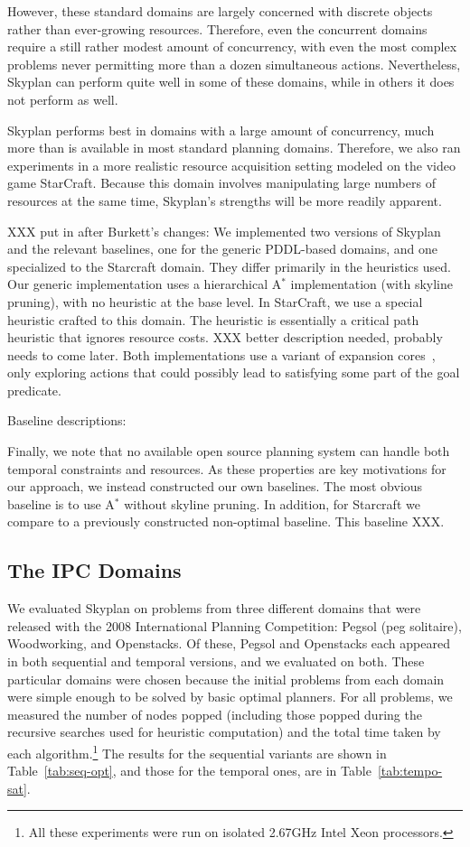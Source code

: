 \documentclass[letterpaper]{article}
\theoremstyle{plain} \newtheorem{theorem}{Theorem} \newtheorem{proposition}{Proposition} \newtheorem{lemma}{Lemma}
\theoremstyle{definition} \newtheorem{definition}{Definition} \newtheorem{conjecture}{Conjecture} \newtheorem*{example}{Example}
\theoremstyle{remark} \newtheorem*{remark}{Remark} \newtheorem*{note}{Note} \newtheorem{case}{Case}
\newcommand{\Astar}{A$^*$ }
\begin{document}
However, these standard domains are largely concerned with discrete objects
rather than ever-growing resources. Therefore, even the concurrent domains
require a still rather modest amount of concurrency, with even the most complex
problems never permitting more than a dozen simultaneous actions. Nevertheless, Skyplan can perform quite well in some of these domains, while in others it does not perform as well.

Skyplan performs best in domains with a large amount of concurrency, much more
than is available in most standard planning domains. Therefore, we also ran
experiments in a more realistic resource acquisition setting modeled on the
video game StarCraft. Because this domain involves manipulating large numbers
of resources at the same time, Skyplan's strengths will be more readily
apparent.

XXX put in after Burkett's changes: We implemented two versions of Skyplan and the relevant baselines, one for
the generic PDDL-based domains, and one specialized to the Starcraft domain. They differ primarily in the
heuristics used. Our generic implementation uses a hierarchical \Astar implementation (with skyline pruning),
with no heuristic at the base level. In StarCraft, we use a special heuristic crafted to this domain. The
heuristic is essentially a critical path heuristic that ignores resource costs. XXX better description needed,
probably needs to come later. Both implementations use a variant of expansion cores~\citep{chen09completeness,
xu11theory}, only exploring actions that could possibly lead to satisfying some part of the goal predicate.


Baseline descriptions:

Finally, we note that no available open source planning system can handle both temporal constraints and resources. As these properties are key motivations for our approach, we instead constructed our own baselines.
The most obvious baseline is to use \Astar without skyline pruning. In addition, for Starcraft we compare to a previously constructed non-optimal baseline. This baseline XXX.


\subsection{The IPC Domains}

We evaluated Skyplan on problems from three different domains that were released with the 2008 International
Planning Competition: Pegsol (peg solitaire), Woodworking, and Openstacks. Of these, Pegsol and Openstacks
each appeared in both sequential and temporal versions, and we evaluated on both. These particular domains were
chosen because the initial problems from each domain were simple enough to be solved by basic optimal 
planners. For all problems, we measured
the number of nodes popped (including those popped during the recursive searches used
for heuristic computation) and the total time taken by each algorithm.\footnote{All
these experiments were run on isolated 2.67GHz Intel Xeon processors.} The results for the sequential variants
are shown in Table~\ref{tab:seq-opt}, and those for the temporal ones, are in Table~\ref{tab:tempo-sat}.
\end{document}
